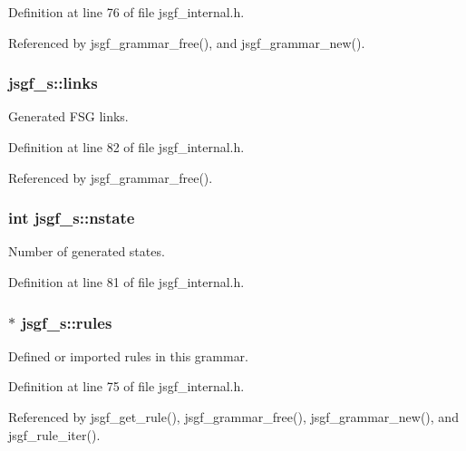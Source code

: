\-Definition at line 76 of file jsgf\-\_\-internal.\-h.



\-Referenced by jsgf\-\_\-grammar\-\_\-free(), and jsgf\-\_\-grammar\-\_\-new().

\subsubsection[{links}]{ {\bf jsgf\-\_\-s\-::links}}\label{structjsgf__s_a6ee31bac19680f01c413969a75ad838a}


\-Generated \-F\-S\-G links. 



\-Definition at line 82 of file jsgf\-\_\-internal.\-h.



\-Referenced by jsgf\-\_\-grammar\-\_\-free().

\subsubsection[{nstate}]{\setlength{\rightskip}{0pt plus 5cm}int {\bf jsgf\-\_\-s\-::nstate}}\label{structjsgf__s_a380c1b82e1bd776438303159e5129773}


\-Number of generated states. 



\-Definition at line 81 of file jsgf\-\_\-internal.\-h.

\subsubsection[{rules}]{$\ast$ {\bf jsgf\-\_\-s\-::rules}}\label{structjsgf__s_af257160279ab56ffca65966aeac18ef9}


\-Defined or imported rules in this grammar. 



\-Definition at line 75 of file jsgf\-\_\-internal.\-h.



\-Referenced by jsgf\-\_\-get\-\_\-rule(), jsgf\-\_\-grammar\-\_\-free(), jsgf\-\_\-grammar\-\_\-new(), and jsgf\-\_\-rule\-\_\-iter().

